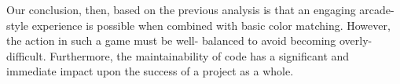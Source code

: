 Our conclusion, then, based on the previous analysis
is that an engaging arcade-style experience is possible when
combined with basic color matching. However, the action in such
a game must be well- balanced to avoid becoming overly-difficult.
Furthermore, the maintainability of code has a significant and
immediate impact upon the success of a project as a whole.
